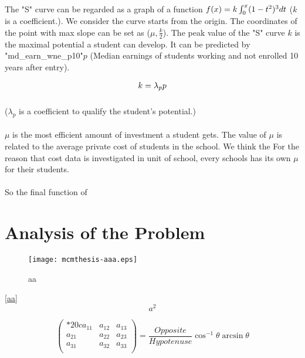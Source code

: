 \documentclass{mcmthesis}
\begin{document}
\paragraph{} The "S" curve can be regarded as a graph of a function $f(x)=k\*\int_{0}^{x}(1-t^2)^3\*dt$ ($k$ is a coefficient.). We consider the curve starts from the origin. The coordinates of the point with max slope can be set as ($\mu, \frac{k}{2}$). The peak value of the "S" curve $k$ is the maximal potential a student can develop. It can be predicted by "md\_earn\_wne\_p10"$p$ (Median earnings of students working and not enrolled 10 years after entry).

\begin{align}
k=\*\lambda_p\*p
\end{align}

\subparagraph{} ($\lambda_p$ is a coefficient to qualify the student's potential.)

\paragraph{} $\mu$ is the most efficient amount of investment a student gets. The value of $\mu$ is related to the average private cost of students in the school. We think the For the reason that cost data is investigated in unit of school, every schools has its own $\mu$ for their students. 
\paragraph{} So the final function of 


\section{Analysis of the Problem}

\begin{figure}[h]
\small
\centering
\texttt{[image: mcmthesis-aaa.eps]}
\caption{aa} \label{fig:aa}
\end{figure}


\lipsum[8]
\eqref{aa}
\begin{equation}
a^2 \label{aa}
\end{equation}

\[
  \begin{pmatrix}{*{20}c}
  {a_{11} } & {a_{12} } & {a_{13} }  \\
  {a_{21} } & {a_{22} } & {a_{23} }  \\
  {a_{31} } & {a_{32} } & {a_{33} }  \\
  \end{pmatrix}
  = \frac{{Opposite}}{{Hypotenuse}}\cos ^{ - 1} \theta \arcsin \theta
\]
\lipsum[9]
\end{document}
